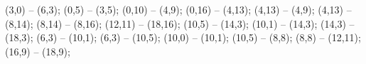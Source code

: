    (3,0) -- (6,3);
   (0,5) -- (3,5);
   (0,10) -- (4,9);
   (0,16) -- (4,13);
   (4,13) -- (4,9);
   (4,13) -- (8,14);
   (8,14) -- (8,16);
   (12,11) -- (18,16);
   (10,5) -- (14,3);
   (10,1) -- (14,3);
   (14,3) -- (18,3);
   (6,3) -- (10,1);
   (6,3) -- (10,5);
   (10,0) -- (10,1);
   (10,5) -- (8,8);
   (8,8) -- (12,11);
   (16,9) -- (18,9);
